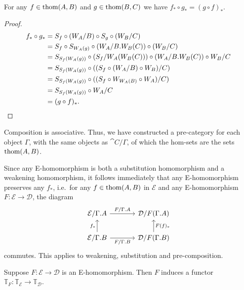 \begin{lem}
For any $f\in\mathrm{thom}(A,B)$ and $g\in\mathrm{thom}(B,C)$ we have $f_\ast\circ g_\ast=(g\circ f)_\ast$. 
\end{lem}

\begin{proof}
\begin{align*}
f_\ast\circ g_\ast & = S_f\circ (W_A/B) \circ S_g \circ (W_B/C)\\
& = S_f\circ S_{W_A(g)}\circ(W_A/\ctxext{B}{W_B(C)})\circ (W_B/C) \\
& = S_{S_f(W_A(g))}\circ (S_f/W_A(W_B(C)))\circ (W_A/\ctxext{B}{W_B(C)}) \circ W_B/C \\
& = S_{S_f(W_A(g))}\circ ((S_f\circ (W_A/B) \circ W_B)/C) \\
& = S_{S_f(W_A(g))}\circ ((S_f\circ W_{W_A(B)}\circ W_A)/C) \\
& = S_{S_f(W_A(g))}\circ W_A/C \\
& = (g\circ f)_\ast.\qedhere
\end{align*}
\end{proof}

\begin{cor}
Composition is associative. Thus, we have constructed a pre-category for each
object $\Gamma$, with the same objects as $\cat{C}/\Gamma$, of which the hom-sets
are the sets $\mathrm{thom}(A,B)$. 
\end{cor}

\begin{rmk}
Since any E-homomorphism is both a substitution homomorphism and a weakening
homomorphism, it follows immediately that any E-homomorphism preserves any
$f_\ast$, i.e.~for any $f\in\mathrm{thom}(A,B)$ in $\mathcal{E}$ and any E-homomorphism
$F:\mathcal{E}\to\mathcal{D}$, the diagram
\begin{equation*}
\begin{tikzcd}[column sep=large]
\mathcal{E}/\ctxext{\Gamma}{A} \arrow[r,"F/\ctxext{\Gamma}{A}"] & \mathcal{D}/F(\ctxext{\Gamma}{A})
  \\
\mathcal{E}/\ctxext{\Gamma}{B} \arrow[u,"f_\ast"] \arrow[r,swap,"F/\ctxext{\Gamma}{B}"] & \mathcal{D}/F(\ctxext{\Gamma}{B}) \arrow[u,swap,"F(f)_\ast"]
\end{tikzcd}
\end{equation*}
commutes. This applies to weakening, substitution and pre-composition.
\end{rmk}

\begin{cor}
Suppose $F:\mathcal{E}\to\mathcal{D}$ is an E-homomorphism. Then $F$ induces
a functor $\mathbb{T}_F:\mathbb{T}_\mathcal{E}\to \mathbb{T}_\mathcal{D}$. 
\end{cor}

